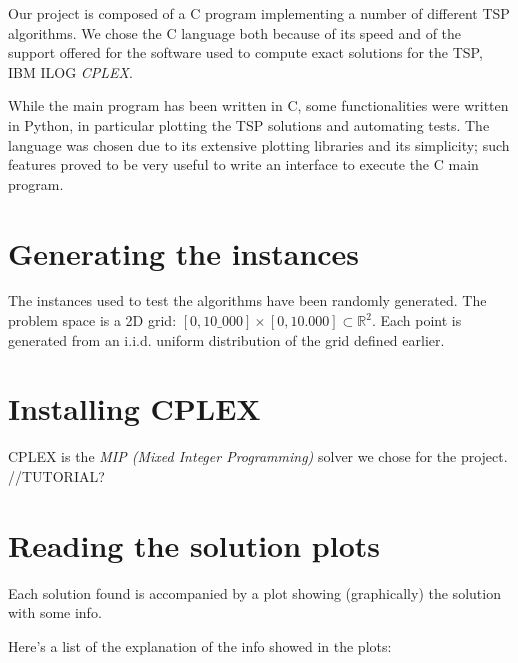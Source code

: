 Our project is composed of a C program implementing a number of different TSP algorithms. We chose the C language both because of its speed and of the support offered for the software used to compute exact solutions for the TSP, IBM ILOG \textit{CPLEX}.

While the main program has been written in C, some functionalities were written in Python, in particular plotting the TSP solutions and automating tests. The language was chosen due to its extensive plotting libraries and its simplicity; such features proved to be very useful to write an interface to execute the C main program.

\section{Generating the instances}

The instances used to test the algorithms have been randomly generated. The problem space is a 2D grid: $[0,10\_000]\times[0,10.000]\subset\mathbb{R}^2$. Each point is generated from an i.i.d. uniform distribution of the grid defined earlier.

\section{Installing CPLEX}

CPLEX is the \textit{MIP (Mixed Integer Programming)} solver we chose for the project. //TUTORIAL?

\section{Reading the solution plots}

Each solution found is accompanied by a plot showing (graphically) the solution with some info.

Here's a list of the explanation of the info showed in the plots:

